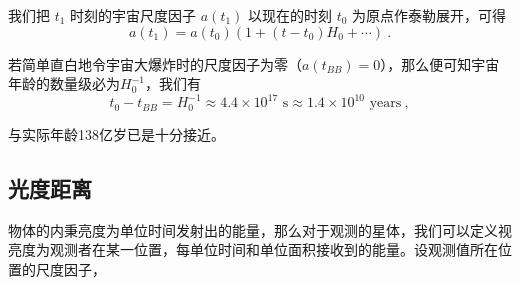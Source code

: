 我们把 $t_1$ 时刻的宇宙尺度因子 $a(t_1)$ 以现在的时刻 $t_0$ 为原点作泰勒展开，可得
\begin{equation}
a(t_1)=a(t_0)(1+(t-t_0)H_0+\cdots)~.
\end{equation}

若简单直白地令宇宙大爆炸时的尺度因子为零（$a(t_{BB})=0$），那么便可知宇宙年龄的数量级必为$H_0^{-1}$，我们有
\begin{equation}t_0-t_{BB}=H_0^{-1}\approx4.4\times10^{17}\text{ s}\approx1.4\times10^{10}\text{ years}~,\end{equation}

与实际年龄138亿岁已是十分接近。
\subsection{光度距离}
物体的内秉亮度为单位时间发射出的能量，那么对于观测的星体，我们可以定义视亮度为观测者在某一位置，每单位时间和单位面积接收到的能量。设观测值所在位置的尺度因子，